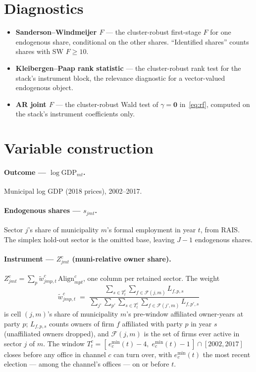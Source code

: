 \documentclass{article}
\newcommand{\Align}{\mathrm{Align}}
\newcommand{\cF}{\mathcal{F}}
\newcommand{\bzero}{\mathbf{0}}
\begin{document}
\section{Diagnostics}\label{sec:diag}

\begin{itemize}[leftmargin=*,nosep]
\item \textbf{Sanderson--Windmeijer $F$} --- the cluster-robust first-stage $F$
  for one endogenous share, conditional on the other shares. ``Identified
  shares'' counts shares with SW $F\ge10$.
\item \textbf{Kleibergen--Paap rank statistic} --- the cluster-robust rank test
  for the stack's instrument block, the relevance diagnostic for a
  vector-valued endogenous object.
\item \textbf{AR joint $F$} --- the cluster-robust Wald test of $\gamma=\bzero$
  in~\eqref{eq:rf}, computed on the stack's instrument coefficients only.
\end{itemize}

\section{Variable construction}\label{sec:vars}

\paragraph{Outcome --- $\log\mathrm{GDP}_{mt}$.}
Municipal log GDP (2018 prices), 2002--2017.

\paragraph{Endogenous shares --- $s_{jmt}$.}
Sector $j$'s share of municipality $m$'s formal employment in year $t$, from
RAIS. The simplex hold-out sector is the omitted base, leaving $J-1$ endogenous
shares.

\paragraph{Instrument --- $Z^{c}_{jmt}$ (muni-relative owner share).}
$Z^{c}_{jmt}=\sum_{p}\tilde w^{c}_{jmp,t}\,\Align^{c}_{mpt}$, one column per
retained sector. The weight
\[
  \tilde w^{c}_{jmp,t}
  \;=\;
  \frac{\sum_{s\in T^{c}_{t}}\sum_{f\in\cF(j,m)} L_{f,p,s}}
       {\sum_{j'}\sum_{p'}\sum_{s\in T^{c}_{t}}\sum_{f\in\cF(j',m)} L_{f,p',s}}
\]
is cell $(j,m)$'s share of municipality $m$'s pre-window affiliated owner-years
at party $p$; $L_{f,p,s}$ counts owners of firm $f$ affiliated with party $p$ in
year $s$ (unaffiliated owners dropped), and $\cF(j,m)$ is the set of firms ever
active in sector $j$ of $m$. The window
$T^{c}_{t}=[\,e^{\min}_{c}(t)-4,\;e^{\min}_{c}(t)-1\,]\cap[2002,2017]$ closes
before any office in channel $c$ can turn over, with $e^{\min}_{c}(t)$ the most
recent election --- among the channel's offices --- on or before $t$.
\end{document}
